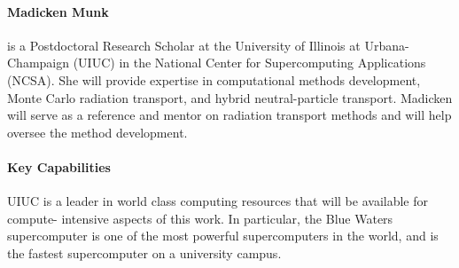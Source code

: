 \documentclass[letterpaper,12pt]{article}
\begin{document}
\paragraph{Madicken Munk} is a Postdoctoral Research Scholar at the University
of Illinois at Urbana-Champaign (UIUC) in the National Center for Supercomputing
Applications (NCSA). She will provide expertise in computational methods
development, Monte Carlo radiation transport, and hybrid neutral-particle
transport. Madicken will serve as a reference and mentor on radiation transport
methods and will help oversee the method development.

\paragraph{Key Capabilities}

UIUC is a leader in world class computing resources that will be available for compute-
intensive aspects of this work. In particular, the Blue Waters supercomputer is
one of the most powerful supercomputers in the world, and is the fastest
supercomputer on a university campus.
\pagebreak


\end{document}
